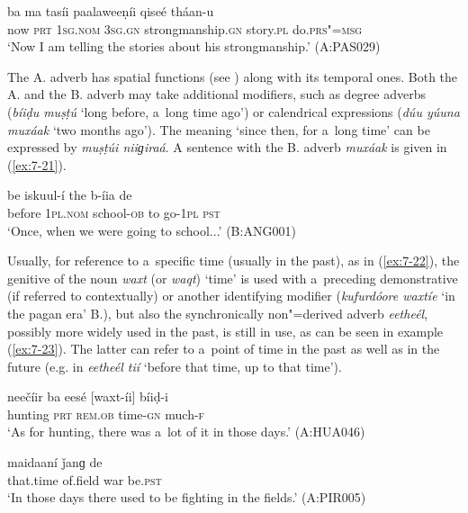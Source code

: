 \begin{exe}
\ex
\label{ex:7-20}
\gll [típa] ba ma tasíi paalaweeṇíi qiseé tháan-u \\
now \textsc{prt} \textsc{1sg.nom} \textsc{3sg.gn} strongmanship.\textsc{gn} story.\textsc{pl} do.\textsc{prs"=msg}\\
\glt `Now I am telling the stories about his strongmanship.' (A:PAS029)
\end{exe}

 The A. adverb has spatial functions (see ) along with its temporal ones. Both the A. and the B. adverb may take additional modifiers, such as degree adverbs (\textit{bíiḍu muṣṭú} `long before, a~long time ago') or calendrical expressions (\textit{dúu yúuna muxáak} `two months ago'). The meaning `since then, for a~long time' can be expressed by \textit{muṣṭúi niiɡiraá}. A sentence with the B. adverb \textit{muxáak} is given in (\ref{ex:7-21}).

\begin{exe}
\ex
\label{ex:7-21}
\gll [muxáak] be iskuul-í the b-íia de \\
before  \textsc{1pl.nom} school-\textsc{ob} to go-\textsc{1pl} \textsc{pst}\\
\glt `Once, when we were going to school...' (B:ANG001)
\end{exe}

 Usually, for reference to a~specific time (usually in the past), as in (\ref{ex:7-22}), the genitive of the noun \textit{waxt} (or \textit{waqt}) `time' is used with a~preceding demonstrative (if referred to contextually) or another identifying modifier (\textit{kufurdóore waxtíe} `in the pagan era' B.), but also the synchronically non"=derived adverb \textit{eetheél}, possibly more widely used in the past, is still in use, as can be seen in example (\ref{ex:7-23}). The latter can refer to a~point of time in the past as well as in the future (e.g. in \textit{eetheél tií} `before that time, up to that time').

\begin{exe}
\ex
\label{ex:7-22}
\gll neečíir ba eesé [waxt-íi] bíiḍ-i \\
hunting \textsc{prt} \textsc{rem.ob} time-\textsc{gn}  much-\textsc{f } \\
\glt `As for hunting, there was a~lot of it in those days.' (A:HUA046)

\ex
\label{ex:7-23}
\gll [eetheél] maidaaní ǰanɡ de \\
that.time  of.field  war be.\textsc{pst } \\
\glt `In those days there used to be fighting in the fields.' (A:PIR005)
\end{exe}

